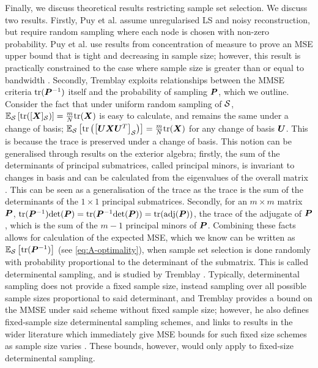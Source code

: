 Finally, we discuss theoretical results restricting sample set selection. We discuss two results. Firstly, Puy et al. \cite[Theorem 6]{puy2018random} assume unregularised LS and noisy reconstruction, but require random sampling where each node is chosen with non-zero probability. Puy et al. use results from concentration of measure to prove an MSE upper bound that is tight and decreasing in sample size; however, this result is practically constrained to the case where sample size is greater than or equal to bandwidth \cite[(3)]{puy2018random}. Secondly, Tremblay \cite{tremblay2024graph} exploits relationships between the MMSE criteria $\text{tr}(\bm{P}^{-1})$ itself and the probability of sampling $\bm{P}$, which we outline. Consider the fact that under uniform random sampling of $\mathcal{S}$, $\expect[\set{S}]{\text{tr}(\matrsub[S]{X})} = \frac{m}{N}\text{tr}(\matr{X})$ is easy to calculate, and remains the same under a change of basis; $\expect[\set{S}]{\text{tr}\left(\msubgen[\set{S}]{\matr{U}\matr{X}\matr{U}^{T}}\right)} = \frac{m}{N}\text{tr}(\matr{X})$ for any change of basis $\bm{U}$. This is because the trace is preserved under a change of basis. This notion can be generalised through results on the exterior algebra; firstly, the sum of the determinants of principal submatrices, called principal minors, is invariant to changes in basis and can be calculated from the eigenvalues of the overall matrix \cite[Theorem 1.2.16]{horn-and-johnson}. This can be seen as a generalisation of the trace as the trace is the sum of the determinants of the $1 \times 1$ principal submatrices. Secondly, for an $m \times m$ matrix $\bm{P}$, $\text{tr}(\bm{P}^{-1})\text{det}(\bm{P}) = \text{tr}(\bm{P}^{-1}\text{det}(\bm{P})) = \text{tr}(\text{adj}(\bm{P}))$, the trace of the adjugate of $\bm{P}$, which is the sum of the $m-1$ principal minors of $\bm{P}$. Combining these facts allows for calculation of the expected MSE, which we know can be written as $\expect[\set{S}]{\text{tr}(\matr{P}^{-1})}$ (see \ref{eq:A-optimality}), when sample set selection is  done randomly with probability proportional to the determinant of the submatrix. This is called determinental sampling, and is studied by Tremblay \cite{tremblay2024graph}. Typically, determinental sampling does not provide a fixed sample size, instead sampling over all possible sample sizes proportional to said determinant, and Tremblay provides a bound \cite[(4.14)]{tremblay2024graph} on the MMSE under said scheme without fixed sample size; however, he also defines fixed-sample size determinental sampling schemes, and links to results in the wider literature which immediately give MSE bounds for such fixed size schemes as sample size varies \cite[Theorem 4]{derezinski2017unbiased}. These bounds, however, would only apply to fixed-size determinental sampling.

